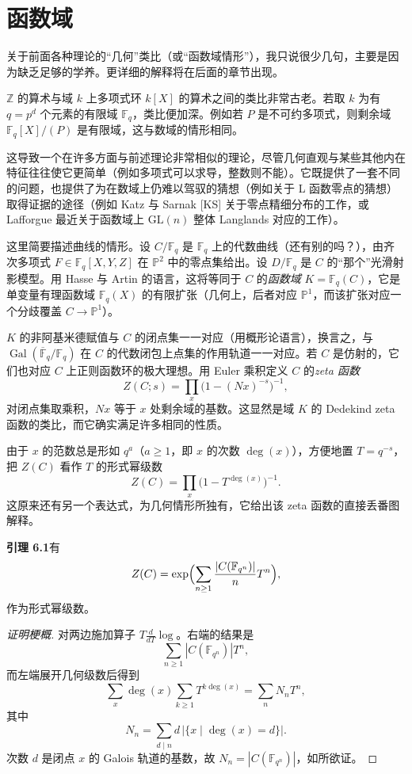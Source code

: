 \section{函数域}\label{sec:6}

关于前面各种理论的“几何”类比（或“函数域情形”），我只说很少几句，主要是因为缺乏足够的学养。更详细的解释将在后面的章节出现。

$\mathbb{Z}$ 的算术与域 $k$ 上多项式环 $k[X]$ 的算术之间的类比非常古老。若取 $k$ 为有 $q=p^{d}$ 个元素的有限域 $\mathbb{F}_q$，类比便加深。例如若 $P$ 是不可约多项式，则剩余域 $\mathbb{F}_q[X]/(P)$ 是有限域，这与数域的情形相同。

这导致一个在许多方面与前述理论非常相似的理论，尽管几何直观与某些其他内在特征往往使它更简单（例如多项式可以求导，整数则不能）。它既提供了一套不同的问题，也提供了为在数域上仍难以驾驭的猜想（例如关于 L 函数零点的猜想）取得证据的途径（例如 Katz 与 Sarnak [KS] 关于零点精细分布的工作，或 Lafforgue 最近关于函数域上 $\mathrm{GL}(n)$ 整体 Langlands 对应的工作）。

这里简要描述曲线的情形。设 $C/\mathbb{F}_q$ 是 $\mathbb{F}_q$ 上的代数曲线（还有别的吗？），由齐次多项式 $F\in\mathbb{F}_q[X,Y,Z]$ 在 $\mathbb{P}^{2}$ 中的零点集给出。设 $D/\mathbb{F}_q$ 是 $C$ 的“那个”光滑射影模型。用 Hasse 与 Artin 的语言，这将等同于 $C$ 的\emph{函数域} $K=\mathbb{F}_q(C)$，它是单变量有理函数域 $\mathbb{F}_q(X)$ 的有限扩张（几何上，后者对应 $\mathbb{P}^{1}$，而该扩张对应一个分歧覆盖 $C\to\mathbb{P}^{1}$）。

$K$ 的非阿基米德赋值与 $C$ 的闭点集一一对应（用概形论语言），换言之，与 $\operatorname{Gal}(\overline{\mathbb{F}}_q/\mathbb{F}_q)$ 在 $C$ 的代数闭包上点集的作用轨道一一对应。若 $C$ 是仿射的，它们也对应 $C$ 上正则函数环的极大理想。用 Euler 乘积定义 $C$ 的\emph{zeta 函数}
\[
Z(C;s)=\prod_{x}\bigl(1-(Nx)^{-s}\bigr)^{-1},
\]
对闭点集取乘积，$Nx$ 等于 $x$ 处剩余域的基数。这显然是域 $K$ 的 Dedekind zeta 函数的类比，而它确实满足许多相同的性质。

由于 $x$ 的范数总是形如 $q^{a}$（$a\ge 1$，即 $x$ 的次数 $\deg(x)$），方便地置 $T=q^{-s}$，把 $Z(C)$ 看作 $T$ 的形式幂级数
\[
Z(C)=\prod_{x}\bigl(1-T^{\deg(x)}\bigr)^{-1}.
\]
这原来还有另一个表达式，为几何情形所独有，它给出该 zeta 函数的直接丢番图解释。

\par\medskip\noindent\textbf{引理 6.1}\quad 有
\[
Z(C)=\exp\Bigl(\sum_{n\ge 1}\frac{|C(\mathbb{F}_{q^{n}})|}{n}T^{n}\Bigr),
\]
作为形式幂级数。

\begin{proof}[证明梗概]
对两边施加算子 $T\frac{d}{dT}\log$。右端的结果是
\[
\sum_{n\ge 1}|C(\mathbb{F}_{q^{n}})|T^{n},
\]
而左端展开几何级数后得到
\[
\sum_{x}\deg(x)\sum_{k\ge 1}T^{k\deg(x)}=\sum_{n}N_nT^{n},
\]
其中
\[
N_n=\sum_{d\mid n}d\,\bigl|\{x\mid \deg(x)=d\}\bigr|.
\]
次数 $d$ 是闭点 $x$ 的 Galois 轨道的基数，故 $N_n=|C(\mathbb{F}_{q^{n}})|$，如所欲证。
\end{proof}

